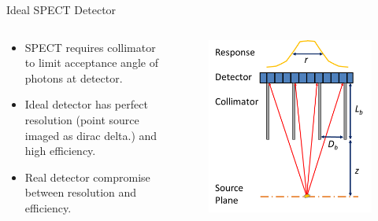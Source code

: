 \begin{frame}[c]{Ideal SPECT Detector}
    \begin{columns}[c, onlytextwidth]
        \begin{column}{0.45\textwidth}
            \begin{itemize}
                \setlength\itemsep{0.3cm}
                \item SPECT requires collimator to limit acceptance angle of photons at detector.
                \item Ideal detector has perfect resolution (point source imaged as dirac delta.) and high efficiency.
                \item Real detector compromise between resolution and efficiency.
            \end{itemize}

        \end{column}

        \begin{column}{0.5\textwidth}
            \begin{figure}[]
                \centering
                \includegraphics[height=0.9\textheight]{images/geometric.png}\\
            \end{figure}

        \end{column}
    \end{columns}
\end{frame}


